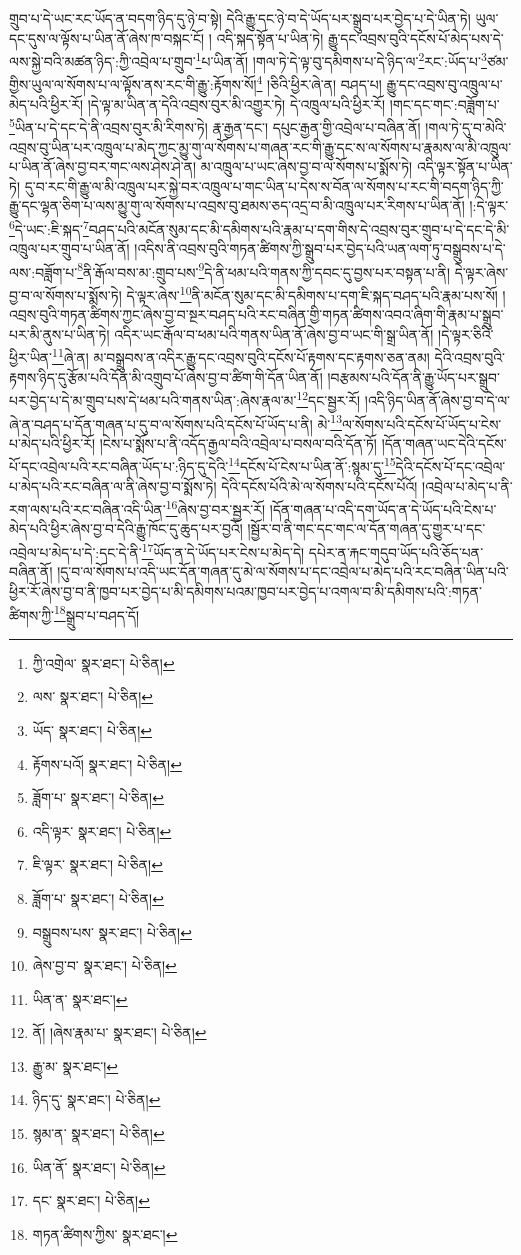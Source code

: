 གྲུབ་པ་དེ་ཡང་རང་ཡོད་ན་བདག་ཉིད་དུ་ཉེ་བ་སྟེ། དེའི་རྒྱུ་དང་ཉེ་བ་དེ་ཡོད་པར་སྒྲུབ་པར་བྱེད་པ་དེ་ཡིན་ཏེ། ཡུལ་དང་དུས་ལ་ལྟོས་པ་ཡིན་ནོ་ཞེས་ཁ་བསྐང་ངོ། །
འདི་སྐད་སྟོན་པ་ཡིན་ཏེ། རྒྱུ་དང་འབྲས་བུའི་དངོས་པོ་མེད་པས་དེ་ལས་སྐྱེ་བའི་མཚན་ཉིད་:ཀྱི་འབྲེལ་པ་གྲུབ་\footnote{ཀྱི་འགྲེལ་  སྣར་ཐང་།  པེ་ཅིན། }པ་ཡིན་ནོ། །གལ་ཏེ་དེ་ལྟ་བུ་དམིགས་པ་དེ་ཉིད་ལ་\footnote{ལས་  སྣར་ཐང་།  པེ་ཅིན། }རང་:ཡོད་པ་\footnote{ཡོད་  སྣར་ཐང་།  པེ་ཅིན། }ཙམ་གྱིས་ཡུལ་ལ་སོགས་པ་ལ་ལྟོས་ནས་རང་གི་རྒྱུ་:རྟོགས་སོ།\footnote{རྟོགས་པའོ།  སྣར་ཐང་།  པེ་ཅིན། } །ཅིའི་ཕྱིར་ཞེ་ན། བཤད་པ། རྒྱུ་དང་འབྲས་བུ་འཁྲུལ་པ་མེད་པའི་ཕྱིར་རོ། །དེ་ལྟ་མ་ཡིན་ན་དེའི་འབྲས་བུར་མི་འགྱུར་ཏེ། དེ་འཁྲུལ་པའི་ཕྱིར་རོ། །གང་དང་གང་:བཟློག་པ་\footnote{ཟློག་པ་  སྣར་ཐང་།  པེ་ཅིན། }ཡིན་པ་དེ་དང་དེ་ནི་འབྲས་བུར་མི་རིགས་ཏེ། རྣ་རྒྱན་དང་། དཔུང་རྒྱན་གྱི་འབྲེལ་པ་བཞིན་ནོ། །གལ་ཏེ་དུ་བ་མེའི་འབྲས་བུ་ཡིན་པར་འཁྲུལ་པ་མེད་ཀྱང་མྱུ་གུ་ལ་སོགས་པ་གཞན་རང་གི་རྒྱུ་དང་ས་ལ་སོགས་པ་རྣམས་ལ་མི་འཁྲུལ་པ་ཡིན་ནོ་ཞེས་བྱ་བར་གང་ལས་ཤེས་ཤེ་ན། མ་འཁྲུལ་པ་ཡང་ཞེས་བྱ་བ་ལ་སོགས་པ་སྨོས་ཏེ། འདི་ལྟར་སྟོན་པ་ཡིན་ཏེ། དུ་བ་རང་གི་རྒྱུ་ལ་མི་འཁྲུལ་པར་སྐྱེ་བར་འཁྲུལ་པ་གང་ཡིན་པ་དེས་ས་བོན་ལ་སོགས་པ་རང་གི་བདག་ཉིད་ཀྱི་རྒྱུ་དང་ལྷན་ཅིག་པ་ལས་མྱུ་གུ་ལ་སོགས་པ་འབྲས་བུ་ཐམས་ཅད་འདྲ་བ་མི་འཁྲུལ་པར་རིགས་པ་ཡིན་ནོ། །:དེ་ལྟར་\footnote{འདི་ལྟར་  སྣར་ཐང་།  པེ་ཅིན། }དེ་ཡང་:ཇི་སྐད་\footnote{ཇི་ལྟར་  སྣར་ཐང་།  པེ་ཅིན། }བཤད་པའི་མངོན་སུམ་དང་མི་དམིགས་པའི་རྣམ་པ་དག་གིས་དེ་འབྲས་བུར་གྲུབ་པ་དེ་དང་དེ་མི་འཁྲུལ་པར་གྲུབ་པ་ཡིན་ནོ། །འདིས་ནི་འབྲས་བུའི་གཏན་ཚིགས་ཀྱི་སྒྲུབ་པར་བྱེད་པའི་ཡན་ལག་ཏུ་བསྒྲུབས་པ་དེ་ལས་:བཟློག་པ་\footnote{ཟློག་པ་  སྣར་ཐང་།  པེ་ཅིན། }ནི་རྒོལ་བས་མ་:གྲུབ་པས་\footnote{བསྒྲུབས་པས་  སྣར་ཐང་།  པེ་ཅིན། }དེ་ནི་ཕམ་པའི་གནས་ཀྱི་དབང་དུ་བྱས་པར་བསྟན་པ་ནི། དེ་ལྟར་ཞེས་བྱ་བ་ལ་སོགས་པ་སྨོས་ཏེ། དེ་ལྟར་ཞེས་\footnote{ཞེས་བྱ་བ་  སྣར་ཐང་།  པེ་ཅིན། }ནི་མངོན་སུམ་དང་མི་དམིགས་པ་དག་ཇི་སྐད་བཤད་པའི་རྣམ་པས་སོ། །འབྲས་བུའི་གཏན་ཚིགས་ཀྱང་ཞེས་བྱ་བ་སྔར་བཤད་པའི་རང་བཞིན་གྱི་གཏན་ཚིགས་འབའ་ཞིག་གི་རྣམ་པ་སྒྲུབ་པར་མི་ནུས་པ་ཡིན་ཏེ། འདིར་ཡང་རྒོལ་བ་ཕམ་པའི་གནས་ཡིན་ནོ་ཞེས་བྱ་བ་ཡང་གི་སྒྲ་ཡིན་ནོ། །དེ་ལྟར་ཅིའི་ཕྱིར་ཡིན་\footnote{ཡིན་ན་  སྣར་ཐང་། }ཞེ་ན། མ་བསྒྲུབས་ན་འདིར་རྒྱུ་དང་འབྲས་བུའི་དངོས་པོ་རྟགས་དང་རྟགས་ཅན་ནམ། དེའི་འབྲས་བུའི་རྟགས་ཉིད་དུ་རྩོམ་པའི་དོན་མི་འགྲུབ་པོ་ཞེས་བྱ་བ་ཚིག་གི་དོན་ཡིན་ནོ། །བརྩམས་པའི་དོན་ནི་རྒྱུ་ཡོད་པར་སྒྲུབ་པར་བྱེད་པ་དེ་མ་གྲུབ་པས་དེ་ཕམ་པའི་གནས་ཡིན་:ཞེས་རྣལ་མ་\footnote{ནོ། །ཞེས་རྣམ་པ་  སྣར་ཐང་།  པེ་ཅིན། }དང་སྦྱར་རོ། །འདི་ཉིད་ཡིན་ནོ་ཞེས་བྱ་བ་དེ་ལ་ཞེ་ན་བཤད་པ་དོན་གཞན་པ་དུ་བ་ལ་སོགས་པའི་དངོས་པོ་ཡོད་པ་ནི། མེ་\footnote{རྒྱུ་མ་  སྣར་ཐང་། }ལ་སོགས་པའི་དངོས་པོ་ཡོད་པ་ངེས་པ་མེད་པའི་ཕྱིར་རོ། །ངེས་པ་སྨོས་པ་ནི་འདོད་རྒྱལ་བའི་འབྲེལ་པ་བསལ་བའི་དོན་ཏོ། །དོན་གཞན་ཡང་དེའི་དངོས་པོ་དང་འབྲེལ་པའི་རང་བཞིན་ཡོད་པ་:ཉིད་དུ་དེའི་\footnote{ཉིད་དུ་  སྣར་ཐང་།  པེ་ཅིན། }དངོས་པོ་ངེས་པ་ཡིན་ནོ་:སྙམ་དུ་\footnote{སྙམ་ན་  སྣར་ཐང་།  པེ་ཅིན། }དེའི་དངོས་པོ་དང་འབྲེལ་པ་མེད་པའི་རང་བཞིན་ལ་ནི་ཞེས་བྱ་བ་སྨོས་ཏེ། དེའི་དངོས་པོའི་མེ་ལ་སོགས་པའི་དངོས་པོའོ། །འབྲེལ་པ་མེད་པ་ནི་རག་ལས་པའི་རང་བཞིན་འདི་ཡིན་\footnote{ཡིན་ནོ་  སྣར་ཐང་།  པེ་ཅིན། }ཞེས་བྱ་བར་སྦྱར་རོ། །དོན་གཞན་པ་འདི་དག་ཡོད་ན་དེ་ཡོད་པའི་ངེས་པ་མེད་པའི་ཕྱིར་ཞེས་བྱ་བ་དེའི་རྒྱུ་ཁོང་དུ་ཆུད་པར་བྱའོ། །སྦྱོར་བ་ནི་གང་དང་གང་ལ་དོན་གཞན་དུ་གྱུར་པ་དང་འབྲེལ་པ་མེད་པ་དེ་:དང་དེ་ནི་\footnote{དང་  སྣར་ཐང་།  པེ་ཅིན། }ཡོད་ན་དེ་ཡོད་པར་ངེས་པ་མེད་དེ། དཔེར་ན་རྐང་གདུབ་ཡོད་པའི་ཅོད་པན་བཞིན་ནོ། །དུ་བ་ལ་སོགས་པ་འདི་ཡང་དོན་གཞན་དུ་མེ་ལ་སོགས་པ་དང་འབྲེལ་པ་མེད་པའི་རང་བཞིན་ཡིན་པའི་ཕྱིར་རོ་ཞེས་བྱ་བ་ནི་ཁྱབ་པར་བྱེད་པ་མི་དམིགས་པའམ་ཁྱབ་པར་བྱེད་པ་འགལ་བ་མི་དམིགས་པའི་:གཏན་ཚིགས་ཀྱི་\footnote{གཏན་ཚིགས་ཀྱིས་  སྣར་ཐང་། }སྒྲུབ་པ་བཤད་དོ། 